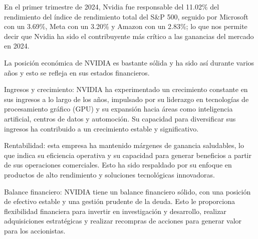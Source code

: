 \documentclass[letterpaper, 12pt]{article}
\begin{document}
En el primer trimestre de 2024, Nvidia fue responsable del
11.02\% del rendimiento del índice de rendimiento total
del S\&P 500, seguido por Microsoft con un 3.69\%, Meta
con un 3.20\% y Amazon con un 2.83\%; lo que nos permite
decir que Nvidia ha sido el contribuyente más crítico a las
ganancias del mercado en 2024.

La posición económica de NVIDIA es bastante sólida y ha sido
así durante varios años y esto se refleja en sus estados financieros.

Ingresos y crecimiento: NVIDIA ha experimentado un crecimiento
constante en sus ingresos a lo largo de los años, impulsado por
su liderazgo en tecnologías de procesamiento gráfico (GPU) y
su expansión hacia áreas como inteligencia artificial, centros
de datos y automoción. Su capacidad para diversificar sus ingresos
ha contribuido a un crecimiento estable y significativo.

Rentabilidad: esta empresa ha mantenido márgenes de ganancia
saludables, lo que indica su eficiencia operativa y su capacidad
para generar beneficios a partir de sus operaciones comerciales.
Esto ha sido respaldado por su enfoque en productos de alto
rendimiento y soluciones tecnológicas innovadoras.

Balance financiero: NVIDIA tiene un balance financiero sólido,
con una posición de efectivo estable y una gestión prudente de
la deuda. Esto le proporciona flexibilidad financiera para
invertir en investigación y desarrollo, realizar adquisiciones
estratégicas y realizar recompras de acciones para generar valor
para los accionistas.
\end{document}
